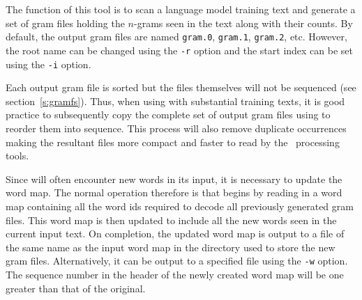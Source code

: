 %
%
%

\newpage
{}



The function of this tool is to scan a language model training text
and generate a set of gram files holding the $n$-grams seen in the text
along with their counts.  By default, the output gram files are named
\texttt{gram.0}, \texttt{gram.1}, \texttt{gram.2}, etc. However, the 
root name can be changed using the \texttt{-r} option and the start
index can be set using the
\texttt{-i} option.  

Each output gram file is sorted but the files themselves will not be
sequenced (see section~\ref{s:gramfs}).  Thus, when using
 with substantial training texts, it is good practice to
subsequently copy the complete set of output gram files using
 to reorder them into sequence. This process will also
remove duplicate occurrences making the resultant files more compact
and faster to read by the \HLM\ processing tools.

Since  will often encounter new words in its input, it
is necessary to update the word map.  The normal operation therefore
is that  begins by reading in a word map containing all
the word ids required to decode all previously generated gram files.
This word map is then updated to include all the new words seen in the
current input text.  On completion, the updated word map is output to
a file of the same name as the input word map in the directory used to
store the new gram files.  Alternatively, it can be output to a
specified file using the \texttt{-w} option.  The sequence number in
the header of the newly created word map will be one greater than that
of the original.

